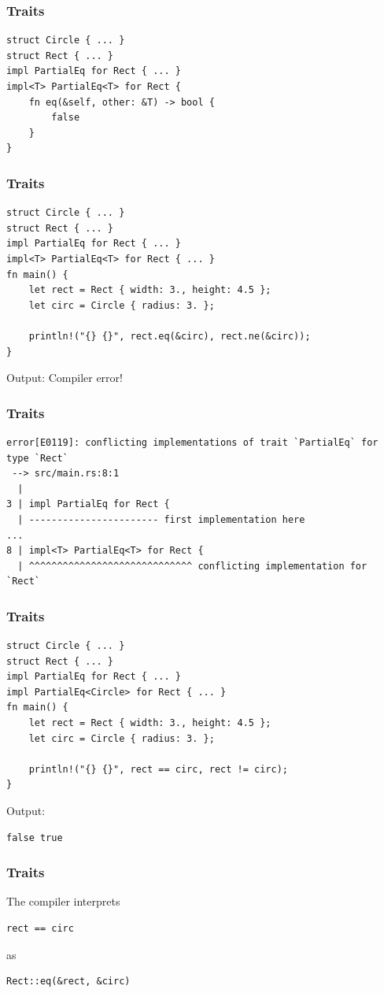 \begin{frame}[fragile]
    \frametitle{Traits}
    \begin{verbatim}
struct Circle { ... }
struct Rect { ... }
impl PartialEq for Rect { ... }
impl<T> PartialEq<T> for Rect {
    fn eq(&self, other: &T) -> bool {
        false
    }
}
    \end{verbatim}
\end{frame}

\begin{frame}[fragile]
    \frametitle{Traits}
    \begin{verbatim}
struct Circle { ... }
struct Rect { ... }
impl PartialEq for Rect { ... }
impl<T> PartialEq<T> for Rect { ... }
fn main() {
    let rect = Rect { width: 3., height: 4.5 };
    let circ = Circle { radius: 3. };

    println!("{} {}", rect.eq(&circ), rect.ne(&circ));
}
    \end{verbatim}
    \vfill
    Output:
    \pause
    \vfill
    Compiler error!
\end{frame}

\begin{frame}[fragile]
    \frametitle{Traits}
    \begin{verbatim}
error[E0119]: conflicting implementations of trait `PartialEq` for type `Rect`
 --> src/main.rs:8:1
  |
3 | impl PartialEq for Rect { 
  | ----------------------- first implementation here
...
8 | impl<T> PartialEq<T> for Rect {
  | ^^^^^^^^^^^^^^^^^^^^^^^^^^^^^ conflicting implementation for `Rect`
    \end{verbatim}
\end{frame}

\begin{frame}[fragile]
    \frametitle{Traits}
    \begin{verbatim}
struct Circle { ... }
struct Rect { ... }
impl PartialEq for Rect { ... }
impl PartialEq<Circle> for Rect { ... }
fn main() {
    let rect = Rect { width: 3., height: 4.5 };
    let circ = Circle { radius: 3. };

    println!("{} {}", rect == circ, rect != circ);
}
    \end{verbatim}
    \vfill
    Output:
    \pause
    \vfill
    \begin{verbatim}
false true
    \end{verbatim}
\end{frame}

\begin{frame}[fragile]
    \frametitle{Traits}
    The compiler interprets
    \vfill
    \begin{verbatim}
rect == circ
    \end{verbatim}
    \vfill
    as
    \vfill
    \begin{verbatim}
Rect::eq(&rect, &circ)
    \end{verbatim}
\end{frame}

